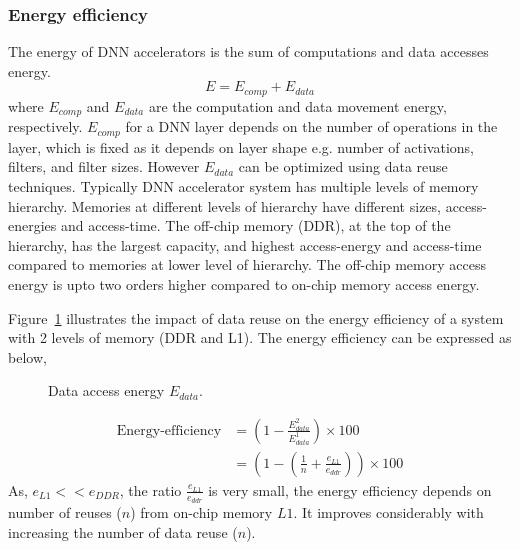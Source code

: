 \documentclass[a4paper,10pt]{article}
\begin{document}
\subsubsection{Energy efficiency}
The energy of DNN accelerators is the sum of computations and data accesses energy. 
\begin{equation}
	E=E_{comp} + E_{data}
\end{equation}
where $E_{comp}$ and $E_{data}$ are the computation and data movement energy, respectively. $E_{comp}$ for a DNN layer depends on the number of operations in the layer, which is fixed as it depends on layer shape e.g. number of activations, filters, and filter sizes. However $E_{data}$ can be optimized using data reuse techniques. Typically DNN accelerator system has multiple levels of memory hierarchy. Memories at different levels of hierarchy have different sizes, access-energies and access-time. The off-chip memory (DDR), at the top of the hierarchy, has the largest capacity, and highest access-energy and access-time compared to memories at lower level of hierarchy.  The off-chip memory access energy is upto two orders higher compared to on-chip memory access energy. 

Figure~\ref{fig:dataAccessEnergy} illustrates the impact of data reuse on the energy efficiency of a system with 2 levels of memory (DDR and L1). The energy efficiency can be expressed as below,
\begin{figure}[!htb]
	\centering
	\hfil
	\caption{Data access energy $E_{data}$.}
	\label{fig:dataAccessEnergy}
	\vspace{-1.0em}	
\end{figure}
\begin{align*}
	\text{Energy-efficiency} &= (1-\frac{E^2_{data}}{E^1_{data}})\times{100}\\
	&= (1-(\frac{1}{n}+\frac{e_{L1}}{e_{ddr}}))\times{100}
\end{align*}
As, $e_{L1} << e_{DDR}$, the ratio $\frac{e_{L1}}{e_{ddr}}$ is very small, the energy efficiency depends on number of reuses ($n$) from on-chip memory $L1$. It improves considerably with increasing the number of data reuse ($n$). 
\end{document}
